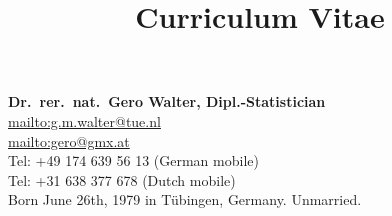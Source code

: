 \documentclass[a4paper]{simplecv}
\begin{document}
\pagestyle{myheadings}




\title{Curriculum Vitae}
\nocite{itip-statinf,Troffaes2014a,diss,Walter2012b,Troffaes2012a,Walter2011a,Walter2010a,%
Walter2009b,Walter2009a,Walter2007c,Walter2007b,Walter2007a,Walter2006a}

\vspace*{-10ex}
\maketitle

\textbf{\large Dr.\ rer.\ nat.\ Gero Walter, Dipl.-Statistician}\\[2ex]
\url{mailto:g.m.walter@tue.nl}\\
\url{mailto:gero@gmx.at}\\
Tel: +49 174 639 56 13 (German mobile)\\
Tel: +31 638 377 678 (Dutch mobile)\\

Born June 26th, 1979 in T\"{u}bingen, Germany. Unmarried.

\end{document}
